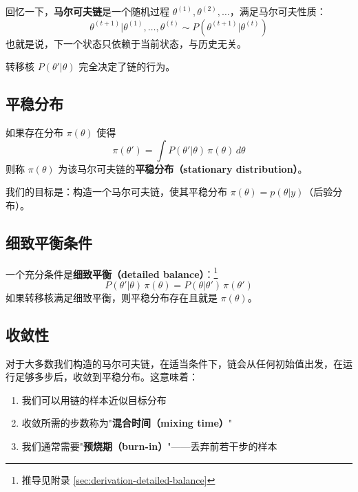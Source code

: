 回忆一下，\textbf{马尔可夫链}是一个随机过程 $\theta^{(1)}, \theta^{(2)}, \ldots$，满足马尔可夫性质：
\begin{equation}\label{eq:markov-property}
\theta^{(t+1)} | \theta^{(1)}, \ldots, \theta^{(t)} \sim P(\theta^{(t+1)} | \theta^{(t)})
\end{equation}
也就是说，下一个状态只依赖于当前状态，与历史无关。

转移核 $P(\theta' | \theta)$ 完全决定了链的行为。

\subsection{平稳分布}

如果存在分布 $\pi(\theta)$ 使得
\begin{equation}\label{eq:stationary-distribution}
\pi(\theta') = \int P(\theta' | \theta) \, \pi(\theta) \, d\theta
\end{equation}
则称 $\pi(\theta)$ 为该马尔可夫链的\textbf{平稳分布（stationary distribution）}。

我们的目标是：构造一个马尔可夫链，使其平稳分布 $\pi(\theta) = p(\theta | y)$（后验分布）。

\subsection{细致平衡条件}

一个充分条件是\textbf{细致平衡（detailed balance）}：\footnote{推导见附录 \cref{sec:derivation-detailed-balance}}
\begin{equation}\label{eq:detailed-balance}
P(\theta' | \theta) \, \pi(\theta) = P(\theta | \theta') \, \pi(\theta')
\end{equation}
如果转移核满足细致平衡，则平稳分布存在且就是 $\pi(\theta)$。

\subsection{收敛性}

对于大多数我们构造的马尔可夫链，在适当条件下，链会从任何初始值出发，在运行足够多步后，收敛到平稳分布。这意味着：

\begin{enumerate}
  \item 我们可以用链的样本近似目标分布
  \item 收敛所需的步数称为"\textbf{混合时间（mixing time）}"
  \item 我们通常需要"\textbf{预烧期（burn-in）}"——丢弃前若干步的样本
\end{enumerate}

